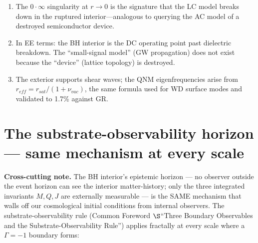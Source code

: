 \begin{enumerate}
    \item The $0 \cdot \infty$ singularity at $r \to 0$ is the signature
    that the LC model breaks down in the ruptured interior---analogous
    to querying the AC model of a destroyed semiconductor device.

    \item In EE terms: the BH interior is the DC operating point
    past dielectric breakdown. The ``small-signal model'' (GW propagation)
    does not exist because the ``device'' (lattice topology) is destroyed.

    \item The exterior supports shear waves; the QNM eigenfrequencies
    arise from $r_{eff} = r_{sat}/(1+\nu_{vac})$, the same formula
    used for WD surface modes and validated to 1.7\% against GR.
\end{enumerate}

\section{The substrate-observability horizon — same mechanism at every scale}
\label{sec:substrate_observability_horizon}

\textbf{Cross-cutting note.}
The BH interior's epistemic horizon --- no observer outside the event horizon
can see the interior matter-history; only the three integrated invariants
$M, Q, J$ are externally measurable --- is the SAME mechanism that walls
off our cosmological initial conditions from internal observers. The
substrate-observability rule (Common Foreword $\S$``Three Boundary
Observables and the Substrate-Observability Rule'') applies fractally at
every scale where a $\Gamma = -1$\gammaundeclared{} boundary forms:


